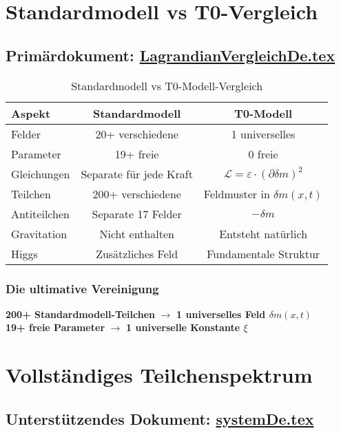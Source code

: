 \documentclass[12pt,a4paper]{report}
\begin{document}
	\section{Standardmodell vs T0-Vergleich}
	\subsection{Primärdokument: \href{https://github.com/jpascher/T0-Time-Mass-Duality/tree/main/2/pdf/LagrandianVergleichDe.pdf}{LagrandianVergleichDe.tex}}
	
	\begin{table}[H]
		\centering
		\begin{tabular}{lcc}
			\toprule
			\textbf{Aspekt} & \textbf{Standardmodell} & \textbf{T0-Modell} \\
			\midrule
			Felder & 20+ verschiedene & 1 universelles \\
			Parameter & 19+ freie & 0 freie \\
			Gleichungen & Separate für jede Kraft & $\mathcal{L} = \varepsilon \cdot (\partial \delta m)^2$ \\
			Teilchen & 200+ verschiedene & Feldmuster in $\delta m(x,t)$ \\
			Antiteilchen & Separate 17 Felder & $-\delta m$ \\
			Gravitation & Nicht enthalten & Entsteht natürlich \\
			Higgs & Zusätzliches Feld & Fundamentale Struktur \\
			\bottomrule
		\end{tabular}
		\caption{Standardmodell vs T0-Modell-Vergleich}
		\label{tab:sm-vs-t0}
	\end{table}
	
	\subsubsection{Die ultimative Vereinigung}
	\textbf{200+ Standardmodell-Teilchen} $\rightarrow$ \textbf{1 universelles Feld $\delta m(x,t)$}\\
	\textbf{19+ freie Parameter} $\rightarrow$ \textbf{1 universelle Konstante $\xi$}
	
	\section{Vollständiges Teilchenspektrum}
	\subsection{Unterstützendes Dokument: \href{https://github.com/jpascher/T0-Time-Mass-Duality/tree/main/2/pdf/systemDe.pdf}{systemDe.tex}}
	
\end{document}
